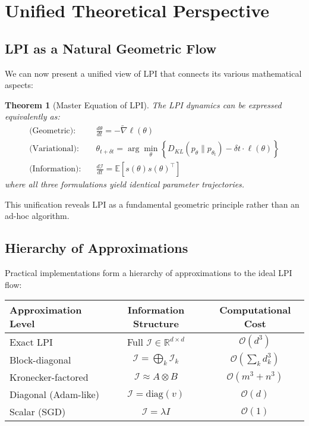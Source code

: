 \documentclass[11pt]{article}
\newtheorem{theorem}{Theorem}
\begin{document}
\section{Unified Theoretical Perspective}

\subsection{LPI as a Natural Geometric Flow}

We can now present a unified view of LPI that connects its various mathematical aspects:

\begin{theorem}[Master Equation of LPI]
\label{thm:master}
The LPI dynamics can be expressed equivalently as:
\begin{align}
\text{(Geometric):} \quad & \frac{d\theta}{dt} = -\tilde{\nabla} \ell(\theta) \\
\text{(Variational):} \quad & \theta_{t+\delta t} = \arg\min_\theta \left\{D_{KL}(p_\theta \| p_{\theta_t}) - \delta t \cdot \ell(\theta)\right\} \\
\text{(Information):} \quad & \frac{d\mathcal{I}}{dt} = \mathbb{E}[s(\theta)s(\theta)^\top]
\end{align}
where all three formulations yield identical parameter trajectories.
\end{theorem}

This unification reveals LPI as a fundamental geometric principle rather than an ad-hoc algorithm.

\subsection{Hierarchy of Approximations}

Practical implementations form a hierarchy of approximations to the ideal LPI flow:

\begin{center}
\begin{tabular}{lcc}
\toprule
\textbf{Approximation Level} & \textbf{Information Structure} & \textbf{Computational Cost} \\
\midrule
Exact LPI & Full $\mathcal{I} \in \mathbb{R}^{d \times d}$ & $\mathcal{O}(d^3)$ \\
Block-diagonal & $\mathcal{I} = \bigoplus_k \mathcal{I}_k$ & $\mathcal{O}(\sum_k d_k^3)$ \\
Kronecker-factored & $\mathcal{I} \approx A \otimes B$ & $\mathcal{O}(m^3 + n^3)$ \\
Diagonal (Adam-like) & $\mathcal{I} = \text{diag}(v)$ & $\mathcal{O}(d)$ \\
Scalar (SGD) & $\mathcal{I} = \lambda I$ & $\mathcal{O}(1)$ \\
\bottomrule
\end{tabular}
\end{center}
\end{document}
